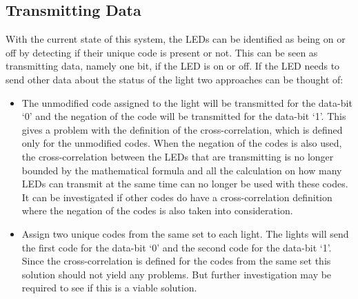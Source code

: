 	\subsection{Transmitting Data}

	With the current state of this system, the LEDs can be identified as being on or off by detecting if their unique code is present or not.
	This can be seen as transmitting data, namely one bit, if the LED is on or off.
	If the LED needs to send other data about the status of the light two approaches can be thought of: 


	\begin{itemize}
		\item The unmodified code assigned to the light will be transmitted for the data-bit `0' and the negation of the code will be transmitted for the data-bit `1'. 
		This gives a problem with the definition of the cross-correlation, which is defined only for the unmodified codes. 
		When the negation of the codes is also used, the cross-correlation between the LEDs that are transmitting is no longer bounded by the mathematical formula and all the calculation on how many LEDs can transmit at the same time can no longer be used with these codes.
		It can be investigated if other codes do have a cross-correlation definition where the negation of the codes is also taken into consideration.

		\item Assign two unique codes from the same set to each light. 
		The lights will send the first code for the data-bit `0' and the second code for the data-bit `1'.
		Since the cross-correlation is defined for the codes from the same set this solution should not yield any problems.
		But further investigation may be required to see if this is a viable solution.
	\end{itemize}


	












